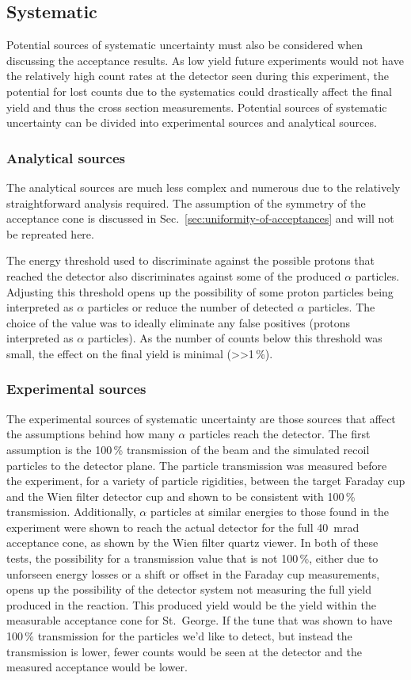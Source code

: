 \subsection{Systematic}

Potential sources of systematic uncertainty must also be considered when
discussing the acceptance results. As low yield future experiments would
not have the relatively high count rates at the detector seen during
this experiment, the potential for lost counts due to the systematics
could drastically affect the final yield and thus the cross section
measurements. Potential sources of systematic uncertainty can be divided
into experimental sources and analytical sources.

\subsubsection{Analytical sources}
The analytical sources are much less complex and numerous due to the
relatively straightforward analysis required. The assumption of the
symmetry of the acceptance cone is discussed in
Sec.~\ref{sec:uniformity-of-acceptances} and will not be repreated here.

The energy threshold used to discriminate against the possible protons
that reached the detector also discriminates against some of the
produced $\alpha$ particles. Adjusting this threshold opens up the
possibility of some proton particles being interpreted as $\alpha$
particles or reduce the number of detected $\alpha$ particles. The
choice of the value was to ideally eliminate any false positives
(protons interpreted as $\alpha$ particles). As the number of counts
below this threshold was small, the effect on the final yield is
minimal (>>1\,\%).

\subsubsection{Experimental sources}
The experimental sources of systematic uncertainty are those sources
that affect the assumptions behind how many $\alpha$ particles reach the
detector. The first assumption is the 100\,\% transmission of the beam
and the simulated recoil particles to the detector plane. The particle
transmission was measured before the experiment, for a variety of
particle rigidities, between the target Faraday cup and the Wien filter
detector cup and shown to be consistent with 100\,\% transmission.
Additionally, $\alpha$ particles at similar energies to those found in
the experiment were shown to reach the actual detector for the full
40~mrad acceptance cone, as shown by the Wien filter quartz viewer. In
both of these tests, the possibility for a transmission value that is
not 100\,\%, either due to unforseen energy losses or a shift or offset
in the Faraday cup measurements, opens up the possibility of the
detector system not measuring the full yield produced in the reaction.
This produced yield would be the yield within the measurable acceptance
cone for St.\ George. If the tune that was shown to have 100\,\%
transmission for the particles we'd like to detect, but instead the
transmission is lower, fewer counts would be seen at the detector and
the measured acceptance would be lower.

